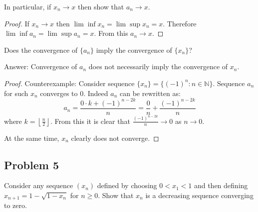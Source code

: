\documentclass{article}
\begin{document}
\begin{tcolorbox}
In particular, if $x_n \to x$ then show that $a_n \to x$.
\end{tcolorbox}
\begin{proof}
If $x_n \to x$ then $\lim \inf x_n = \lim \sup x_n = x$. Therefore $\lim \inf a_n = \lim \sup a_n = x$. From this $a_n \to x$.
\end{proof}

\begin{tcolorbox}
Does the convergence of $\{a_n\}$ imply the convergence of $\{x_n\}$?
\end{tcolorbox}
Answer: Convergence of $a_n$ does not necessarily imply the convergence of $x_n$.
\begin{proof}
Counterexample: Consider sequence $\{ x_n \} = \{ (-1)^n : n \in \mathbb{N} \}$. Sequence $a_n$ for such $x_n$ converges to $0$. Indeed $a_n$ can be rewritten as:
$$ a_n = \frac{0 \cdot k + (-1)^{n-2k}}{n} = \frac{0}{n} + \frac{(-1)^{n-2k}}{n} $$
where $k = \left \lfloor \frac{n}{2} \right \rfloor$.
From this it is clear that $\frac{(-1)^{n-2k}}{n} \to 0$ as $n \to 0$.

At the same time, $x_n$ clearly does not converge.
\end{proof}


\subsection*{Problem 5}

\begin{tcolorbox}
Consider any sequence $(x_n)$ defined by choosing $0 < x_1 < 1$ and then defining $x_{n+1} = 1-\sqrt{1 - x_n}$ for $n \geq 0$. Show that $x_n$ is a decreasing sequence converging to zero.
\end{tcolorbox}
\end{document}
